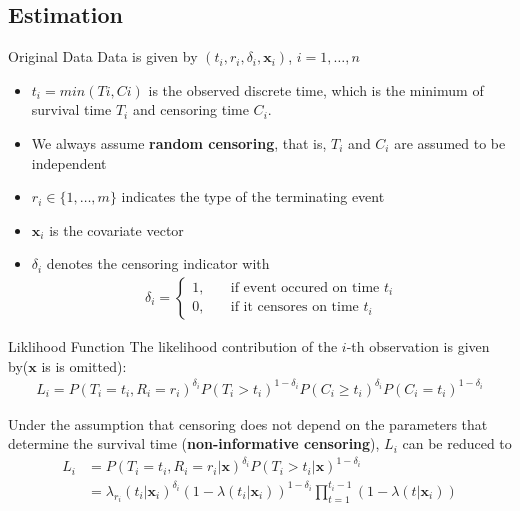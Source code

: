 \documentclass{beamer}
\begin{document}
    \subsection{Estimation}
    \begin{frame}{Original Data}
        Data is given by $(t_i,r_i,\delta_i, \mathbf{x}_i)$, $i = 1,\dots,n$
        \begin{itemize}
            \item $t_i = min(Ti,Ci)$ is the observed discrete time, which is the minimum of survival time $T_i$ and censoring time $C_i$.
            \item We always assume {\bf random censoring}, that is, $T_i$ and $C_i$ are assumed to be independent
            \item $r_i \in \{1,\dots,m\}$ indicates the type of the terminating event
            \item $\mathbf{x}_i$ is the covariate vector
            \item $\delta_i$ denotes the censoring indicator with
            \begin{align*}
            \delta_i = \begin{cases}
            1, &\quad \text{if event occured on time }t_i \\
            0, &\quad \text{if it censores on time }t_i
            \end{cases}
            \end{align*}
        \end{itemize}
    \end{frame}
    
    \begin{frame}{Liklihood Function}
        The likelihood contribution of the $i$-th observation is given by($\mathbf{x}$ is is omitted):
        \begin{align*}
        L_i = P(T_i = t_i,R_i = r_i)^{\delta_i}P(T_i > t_i)^{1-\delta_i} P(C_i \geq t_i)^{\delta_i} P(C_i = t_i)^{1-\delta_i}
        \end{align*}
        
        Under the assumption that censoring does not depend on the parameters that determine the survival time ({\bf non-informative censoring}), $L_i$ can be reduced to
        \begin{align*}
        L_i 
        &= P(T_i = t_i,R_i = r_i|\mathbf{x})^{\delta_i}P(T_i > t_i|\mathbf{x})^{1-\delta_i}  \\
        &=\lambda_{r_i}(t_i|\mathbf{x}_i)^{\delta_i}
        (1-\lambda(t_i|\mathbf{x}_i))^{1-\delta_i}
        \prod_{t=1}^{t_i-1}(1-\lambda(t|\mathbf{x}_i)) \label{log liklihood using delta}
        \end{align*}
    \end{frame}
    
\end{document}
